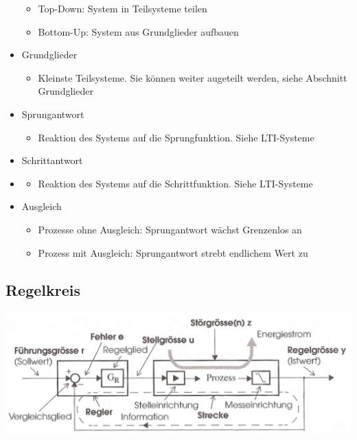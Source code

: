 \documentclass[margin=normal]{tex/hsrzf}
\begin{document}
\begin{itemize}
\begin{itemize}
                  \item Top-Down: System in Teilsysteme teilen
                  \item Bottom-Up: System aus Grundglieder aufbauen
            \end{itemize}
      \item Grundglieder
            \begin{itemize}
                  \item Kleinste Teilsysteme. Sie können weiter augeteilt werden, siehe Abschnitt Grundglieder
            \end{itemize}
      \item Sprungantwort
            \begin{itemize}
                  \item Reaktion des Systems auf die Sprungfunktion. Siehe LTI-Systeme

            \end{itemize}
      \item Schrittantwort
      \item \begin{itemize}
                  \item Reaktion des Systems auf die Schrittfunktion. Siehe LTI-Systeme
            \end{itemize}
      \item Ausgleich
            \begin{itemize}
                  \item Prozesse ohne Ausgleich: Sprungantwort wächst Grenzenlos an
                  \item Prozess mit Ausgleich: Sprungantwort strebt endlichem Wert zu
            \end{itemize}
\end{itemize}
\normalsize

\subsection{Regelkreis}
\includegraphics{img/Regelkreis.png}
\end{document}
